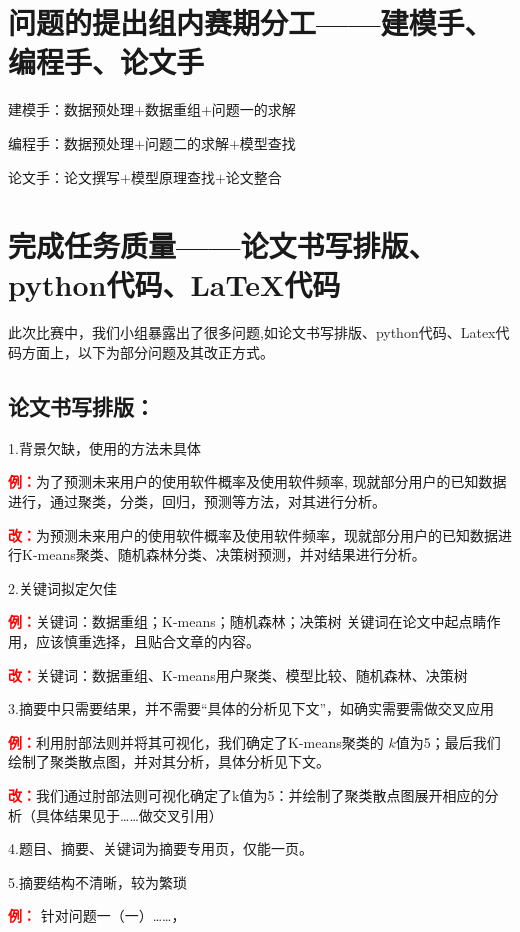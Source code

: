 \documentclass{MathModeling}
\begin{document}
\setcounter{page}{1}
\pagestyle{fancy}

	\section{问题的提出组内赛期分工——建模手、编程手、论文手}
	建模手：数据预处理$+$数据重组$+$问题一的求解

	编程手：数据预处理$+$问题二的求解$+$模型查找

	论文手：论文撰写$+$模型原理查找$+$论文整合
	
	\section{完成任务质量——论文书写排版、python代码、LaTeX代码}
	此次比赛中，我们小组暴露出了很多问题,如论文书写排版、python代码、Latex代码方面上，以下为部分问题及其改正方式。

	\subsection{论文书写排版：}
	1.背景欠缺，使用的方法未具体

	\textbf{\textcolor{red}{例：}}为了预测未来用户的使用软件概率及使用软件频率, 现就部分用户的已知数据进行，通过聚类，分类，回归，预测等方法，对其进行分析。

	\textbf{\textcolor{red}{改：}}为预测未来用户的使用软件概率及使用软件频率，现就部分用户的已知数据进行K-means聚类、随机森林分类、决策树预测，并对结果进行分析。
	
	2.关键词拟定欠佳

	\textbf{\textcolor{red}{例：}}关键词：数据重组；K-means；随机森林；决策树
	关键词在论文中起点睛作用，应该慎重选择，且贴合文章的内容。

	\textbf{\textcolor{red}{改：}}关键词：数据重组、K-means用户聚类、模型比较、随机森林、决策树
	
	3.摘要中只需要结果，并不需要“具体的分析见下文”，如确实需要需做交叉应用

	\textbf{\textcolor{red}{例：}}利用肘部法则并将其可视化，我们确定了K-means聚类的 $k$值为5；最后我们绘制了聚类散点图，并对其分析，具体分析见下文。

	\textbf{\textcolor{red}{改：}}我们通过肘部法则可视化确定了k值为5：并绘制了聚类散点图展开相应的分析（具体结果见于……做交叉引用）
	
	4.题目、摘要、关键词为摘要专用页，仅能一页。
	
	5.摘要结构不清晰，较为繁琐 
	
	\textbf{\textcolor{red}{例：}}
	针对问题一（一）……，
\end{document}
